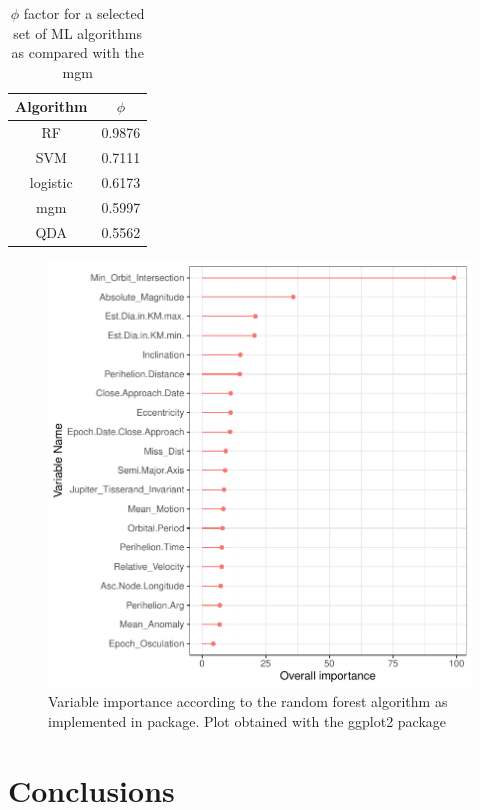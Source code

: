 \documentclass[12pt,%
               a4paper,%
               oneside,openany,%
               titlepage,%
               headinclude,footinclude,%
               BCOR5mm,%
               cleardoublepage=empty,%
               tablecaptionabove,%
               floatperchapter,
               ]{scrreprt}                 %
\begin{document}
\begin{table}[]
\caption{$\phi$ factor for a selected set of ML algorithms as compared with the mgm}
\begin{center}
\begin{tabular}{c|c}
Algorithm & $\phi$ \\ \hline
RF        & 0.9876 \\ \hline
SVM       & 0.7111 \\ \hline
logistic  & 0.6173 \\ \hline
mgm       & 0.5997 \\ \hline
QDA       & 0.5562 
\end{tabular}
\end{center}
\label{phi_values}
\end{table}

\begin{figure}[h]
\begin{center}
\includegraphics[width=1\textwidth]{Figures/RF_Importance.pdf}
\caption{Variable importance according to the random forest algorithm as implemented in \cite{rfor} package. Plot obtained with the ggplot2 package \cite{ggplot2}}
\label{RF_Importance}
\end{center}
\end{figure}


\chapter{Conclusions}
\end{document}
